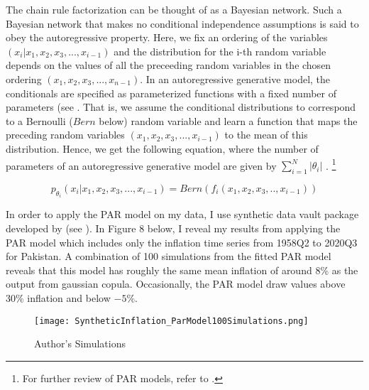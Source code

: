 \documentclass[12pt]{article}
\newcommand{\1}{\mathbbm 1}
\begin{document}
	    The chain rule factorization can be thought of as a Bayesian network. Such a Bayesian network that makes no conditional independence assumptions is said to obey the autoregressive property. Here, we fix an ordering of the variables $(x_{i} | x_{1}, x_{2}, x_{3}, ..., x_{i-1})$  and the distribution for the i-th random variable depends on the values of all the preceeding random variables in the chosen ordering $(x_{1}, x_{2}, x_{3}, ..., x_{n-1})$. In an autoregressive generative model, the conditionals are specified as parameterized functions with a fixed number of parameters (see \cite{salakhutdinov2015learning}. That is, we assume the conditional distributions to correspond to a Bernoulli ($Bern$ below) random variable and learn a function that maps the preceding random variables $(x_{1}, x_{2}, x_{3}, ..., x_{i-1})$ to the mean of this distribution. Hence, we get the following equation, where the number of parameters of an autoregressive generative model are given by $\sum_{i= 1}^{N} |\theta_{i}|$ \cite{grover2018stanford}. \footnote{For further review of PAR models, refer to \color{blue}{https://deepgenerativemodels.github.io/notes/autoregressive/}.} 
	    
	     \begin{equation}
	     	p_{\theta_{i}}(x_{i} | x_{1}, x_{2}, x_{3}, ..., x_{i-1}) = Bern(f_{i}(x_{1}, x_{2}, x_{3}, .., x_{i-1}))
	     \end{equation}
     
     
		
		In order to apply the PAR model on my data, I use synthetic data vault package developed by \cite{patki2016synthetic} (see {\color{blue}{https://sdv.dev/}}). In Figure 8 below, I reveal my results from applying the PAR model which includes only the inflation time series from 1958Q2 to 2020Q3 for Pakistan. A combination of 100 simulations from the fitted PAR model reveals that this model has roughly the same mean inflation of around 8\% as the output from gaussian copula. Occasionally, the PAR model draw values above 30\% inflation and below $-5\%$. 
		
		
		
		\begin{figure}[H]
			\begin{Center}
				\texttt{[image: SyntheticInflation\_ParModel100Simulations.png]}
				\caption{Author's Simulations}
			\end{Center}
		\end{figure}
		
\end{document}
